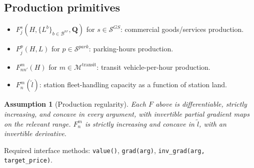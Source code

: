 \documentclass[11pt,a4paper]{article}
\newtheorem{assumption}{Assumption}
\begin{document}
\subsection{Production primitives}
\begin{itemize}[leftmargin=*]
    \item $F_j^s(H, \{L^b\}_{b\in\mathcal{B}^{nr}}, \mathbf{Q})$ for $s \in \mathcal{S}^{GS}$: commercial goods/services production.
    \item $F_j^p(H, L)$ for $p \in \mathcal{S}^{park}$: parking-hours production.
    \item $F^m_{nn'}(H)$ for $m \in \mathcal{M}^{\mathrm{transit}}$: transit vehicle-per-hour production.
    \item $F^m_n(\tilde l)$: station fleet-handling capacity as a function of station land.
\end{itemize}
\begin{assumption}[Production regularity]
Each $F$ above is differentiable, strictly increasing, and concave in every argument, with invertible partial gradient maps on the relevant range. $F^m_n$ is strictly increasing and concave in $\tilde l$, with an invertible derivative.
\end{assumption}
Required interface methods: \texttt{value()}, \texttt{grad(arg)}, \texttt{inv\_grad(arg, target\_price)}.
\end{document}

